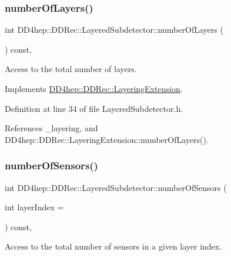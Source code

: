 \subsubsection{\texorpdfstring{number\+Of\+Layers()}{numberOfLayers()}}
{\footnotesize\ttfamily int D\+D4hep\+::\+D\+D\+Rec\+::\+Layered\+Subdetector\+::number\+Of\+Layers (\begin{DoxyParamCaption}{ }\end{DoxyParamCaption}) const\hspace{0.3cm}{\ttfamily [inline]}, {\ttfamily [virtual]}}



Access to the total number of layers. 



Implements \hyperlink{class_d_d4hep_1_1_d_d_rec_1_1_layering_extension_a2a0ee0e2bdb875de6573591e2648e446}{D\+D4hep\+::\+D\+D\+Rec\+::\+Layering\+Extension}.



Definition at line 34 of file Layered\+Subdetector.\+h.



References \+\_\+layering, and D\+D4hep\+::\+D\+D\+Rec\+::\+Layering\+Extension\+::number\+Of\+Layers().

\hypertarget{class_d_d4hep_1_1_d_d_rec_1_1_layered_subdetector_aab3467193b8abb124076afb0a8642e8e}{}\label{class_d_d4hep_1_1_d_d_rec_1_1_layered_subdetector_aab3467193b8abb124076afb0a8642e8e} 
\subsubsection{\texorpdfstring{number\+Of\+Sensors()}{numberOfSensors()}}
{\footnotesize\ttfamily int D\+D4hep\+::\+D\+D\+Rec\+::\+Layered\+Subdetector\+::number\+Of\+Sensors (\begin{DoxyParamCaption}\item[{int}]{layer\+Index = {} }\end{DoxyParamCaption}) const\hspace{0.3cm}{\ttfamily [inline]}, {\ttfamily [virtual]}}



Access to the total number of sensors in a given layer index. 



